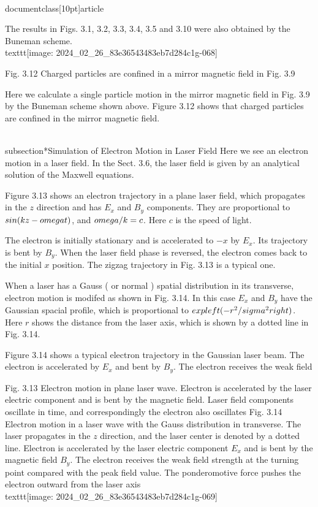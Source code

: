 \\documentclass[10pt]{article}
\begin{document}
The results in Figs. 3.1, 3.2, 3.3, 3.4, 3.5 and 3.10 were also obtained by the Buneman scheme.
\\texttt{[image: 2024\_02\_26\_83e36543483eb7d284c1g-068]}

Fig. 3.12 Charged particles are confined in a mirror magnetic field in Fig. 3.9

Here we calculate a single particle motion in the mirror magnetic field in Fig. 3.9 by the Buneman scheme shown above. Figure 3.12 shows that charged particles are confined in the mirror magnetic field.

\\subsection*{Simulation of Electron Motion in Laser Field}
Here we see an electron motion in a laser field. In the Sect. 3.6, the laser field is given by an analytical solution of the Maxwell equations.

Figure 3.13 shows an electron trajectory in a plane laser field, which propagates in the $z$ direction and has $E_{x}$ and $B_{y}$ components. They are proportional to $\\sin (k z-\\omega t)$, and $\\omega / k=c$. Here $c$ is the speed of light.

The electron is initially stationary and is accelerated to $-x$ by $E_{x}$. Its trajectory is bent by $B_{y}$. When the laser field phase is reversed, the electron comes back to the initial $x$ position. The zigzag trajectory in Fig. 3.13 is a typical one.

When a laser has a Gauss ( or normal ) spatial distribution in its transverse, electron motion is modifed as shown in Fig. 3.14. In this case $E_{x}$ and $B_{y}$ have the Gaussian spacial profile, which is proportional to $\\exp \\left(-r^{2} / \\sigma^{2}\\right)$. Here $r$ shows the distance from the laser axis, which is shown by a dotted line in Fig. 3.14.

Figure 3.14 shows a typical electron trajectory in the Gaussian laser beam. The electron is accelerated by $E_{x}$ and bent by $B_{y}$. The electron receives the weak field

Fig. 3.13 Electron motion in plane laser wave. Electron is accelerated by the laser electric component and is bent by the magnetic field. Laser field components oscillate in time, and correspondingly the electron also oscillates
Fig. 3.14 Electron motion in a laser wave with the Gauss distribution in transverse. The laser propagates in the $z$ direction, and the laser center is denoted by a dotted line. Electron is accelerated by the laser electric component $E_{x}$ and is bent by the magnetic field $B_{y}$. The electron receives the weak field strength at the turning point compared with the peak field value. The ponderomotive force pushes the electron outward from the laser axis
\\texttt{[image: 2024\_02\_26\_83e36543483eb7d284c1g-069]}
\end{document}
